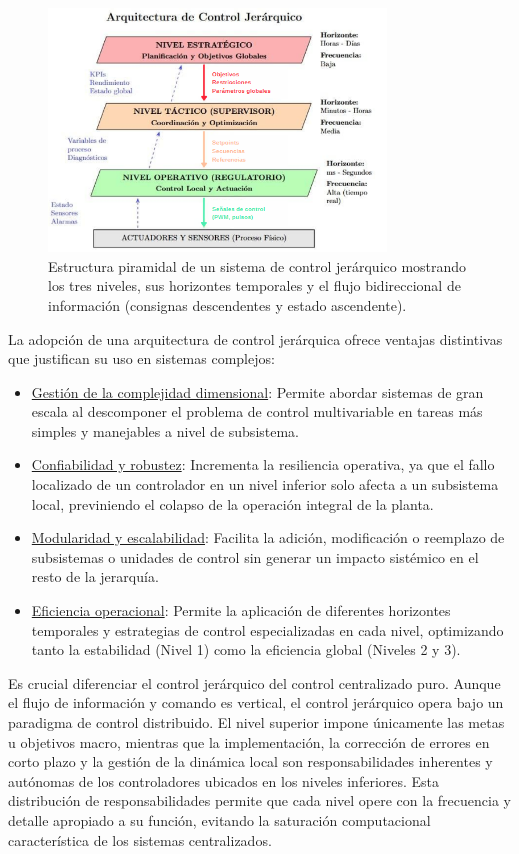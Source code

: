 \begin{figure}[H]
    \centering
    \includegraphics[width=0.8\textwidth]{img/jerarquia_control.png}
    \caption{Estructura piramidal de un sistema de control jerárquico mostrando los tres niveles, sus horizontes temporales y el flujo bidireccional de información (consignas descendentes y estado ascendente).}
    \label{fig:jerarquia_control}
\end{figure}
La adopción de una arquitectura de control jerárquica ofrece ventajas distintivas que justifican su uso en sistemas complejos:
\begin{itemize}[label=$\bullet$]
    \item \underline{Gestión de la complejidad dimensional}: Permite abordar sistemas de gran escala al descomponer el problema de control multivariable en tareas más simples y manejables a nivel de subsistema.
    \item \underline{Confiabilidad y robustez}: Incrementa la resiliencia operativa, ya que el fallo localizado de un controlador en un nivel inferior solo afecta a un subsistema local, previniendo el colapso de la operación integral de la planta.
    \item \underline{Modularidad y escalabilidad}: Facilita la adición, modificación o reemplazo de subsistemas o unidades de control sin generar un impacto sistémico en el resto de la jerarquía.
    \item \underline{Eficiencia operacional}: Permite la aplicación de diferentes horizontes temporales y estrategias de control especializadas en cada nivel, optimizando tanto la estabilidad (Nivel 1) como la eficiencia global (Niveles 2 y 3).
\end{itemize}

Es crucial diferenciar el control jerárquico del control centralizado puro. Aunque el flujo de información y comando es vertical, el control jerárquico opera bajo un paradigma de control distribuido. El nivel superior impone únicamente las metas u objetivos macro, mientras que la implementación, la corrección de errores en corto plazo y la gestión de la dinámica local son responsabilidades inherentes y autónomas de los controladores ubicados en los niveles inferiores. Esta distribución de responsabilidades permite que cada nivel opere con la frecuencia y detalle apropiado a su función, evitando la saturación computacional característica de los sistemas centralizados.

